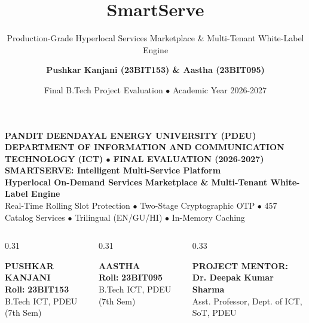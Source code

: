 \documentclass[aspectratio=169,11pt]{beamer}
\title{\textbf{SmartServe}}
\subtitle{Production-Grade Hyperlocal Services Marketplace \& Multi-Tenant White-Label Engine}
\author{\textbf{Pushkar Kanjani (23BIT153) \& Aastha (23BIT095)}}
\institute{Department of Information \& Communication Technology \\ Pandit Deendayal Energy University (PDEU), Gandhinagar}
\date{Final B.Tech Project Evaluation $\bullet$ Academic Year 2026-2027}
\begin{document}
\begin{frame}[plain]
  \begin{tcolorbox}[colback=white,colframe=SmartGold,arc=4mm,width=\textwidth,height=0.92\textheight,halign=center]
    \vspace{0.1cm}
    {\scriptsize \textbf{\color{SmartDark}PANDIT DEENDAYAL ENERGY UNIVERSITY (PDEU)}}\\[0.04cm]
    {\tiny \textbf{\color{gray}DEPARTMENT OF INFORMATION AND COMMUNICATION TECHNOLOGY (ICT) $\bullet$ FINAL EVALUATION (2026-2027)}}\\[0.18cm]
    {\Large \textbf{\color{SmartGreen}SMARTSERVE: Intelligent Multi-Service Platform}}\\[0.08cm]
    {\small \textbf{\color{SmartDark}Hyperlocal On-Demand Services Marketplace \& Multi-Tenant White-Label Engine}}\\[0.12cm]
    {\tiny \color{gray} Real-Time Rolling Slot Protection $\bullet$ Two-Stage Cryptographic OTP $\bullet$ 457 Catalog Services $\bullet$ Trilingual (EN/GU/HI) $\bullet$ In-Memory Caching}\\[0.25cm]
    
    \begin{columns}[T]
      \begin{column}{0.31\textwidth}
        \begin{tcolorbox}[colback=blue!4,colframe=SmartGreen,arc=2mm,halign=left]
          {\footnotesize \textbf{\color{SmartGreen}PUSHKAR KANJANI}}\\[0.04cm]
          {\scriptsize \textbf{Roll:} \color{SmartGold!90!black}\textbf{23BIT153}}\\[0.04cm]
          {\tiny \color{gray}B.Tech ICT, PDEU (7th Sem)}
        \end{tcolorbox}
      \end{column}
      \begin{column}{0.31\textwidth}
        \begin{tcolorbox}[colback=blue!4,colframe=SmartGreen,arc=2mm,halign=left]
          {\footnotesize \textbf{\color{SmartGreen}AASTHA}}\\[0.04cm]
          {\scriptsize \textbf{Roll:} \color{SmartGold!90!black}\textbf{23BIT095}}\\[0.04cm]
          {\tiny \color{gray}B.Tech ICT, PDEU (7th Sem)}
        \end{tcolorbox}
      \end{column}
      \begin{column}{0.33\textwidth}
        \begin{tcolorbox}[colback=yellow!6,colframe=SmartGold,arc=2mm,halign=left]
          {\tiny \textbf{\color{SmartGold}PROJECT MENTOR:}}\\[0.04cm]
          {\footnotesize \textbf{\color{SmartGreen}Dr. Deepak Kumar Sharma}}\\[0.04cm]
          {\tiny \color{SmartDark}Asst. Professor, Dept. of ICT, SoT, PDEU}
        \end{tcolorbox}
      \end{column}
    \end{columns}
    

\end{tcolorbox}
\end{frame}
\end{document}
